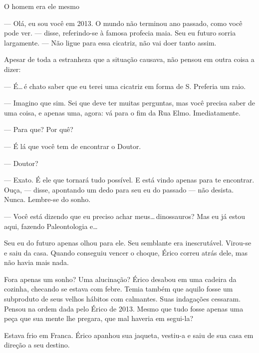 O homem era ele mesmo

--- Olá, eu sou você em 2013. O mundo não terminou ano passado, como
você pode ver. --- disse, referindo-se à famosa profecia maia. Seu eu
futuro sorria largamente. --- Não ligue para essa cicatriz, não vai doer
tanto assim.

Apesar de toda a estranheza que a situação causava, não pensou em outra
coisa a dizer:

--- É\ldots\,é chato saber que eu terei uma cicatriz em forma de S.
Preferia um raio.

--- Imagino que sim. Sei que deve ter muitas perguntas, mas você precisa
saber de uma coisa, e apenas uma, agora: vá para o fim da Rua Elmo.
Imediatamente.

--- Para que? Por quê?

--- É lá que você tem de encontrar o Doutor.

--- Doutor?

--- Exato. É ele que tornará tudo possível. E está vindo apenas para te
encontrar. Ouça, --- disse, apontando um dedo para seu eu do passado ---
não desista. Nunca. Lembre-se do sonho.

--- Você está dizendo que eu preciso achar meus\ldots\,dinossauros? Mas
eu já estou aqui, fazendo Paleontologia e\ldots

Seu eu do futuro apenas olhou para ele. Seu semblante era inescrutável.
Virou-se e saiu da casa. Quando conseguiu vencer o choque, Érico correu
atrás dele, mas não havia mais nada.

Fora apenas um sonho? Uma alucinação? Érico desabou em uma cadeira da
cozinha, checando se estava com febre. Temia também que aquilo fosse um
subproduto de seus velhos hábitos com calmantes. Suas indagações
cessaram. Pensou na ordem dada pelo Érico de 2013. Mesmo que tudo fosse
apenas uma peça que sua mente lhe pregara, que mal haveria em segui-la?

Estava frio em Franca. Érico apanhou sua jaqueta, vestiu-a e saiu de sua
casa em direção a seu destino.
